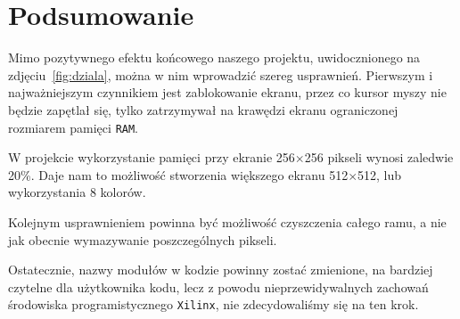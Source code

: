 \section{Podsumowanie}
\label{sec:podsumowanie}

Mimo pozytywnego efektu końcowego naszego projektu, uwidocznionego na
zdjęciu~\ref{fig:dziala}, można w nim wprowadzić szereg usprawnień.  Pierwszym
i najważniejszym czynnikiem jest zablokowanie ekranu, przez co kursor myszy nie
będzie zapętlał się, tylko zatrzymywał na krawędzi ekranu ograniczonej rozmiarem
pamięci \texttt{RAM}.

\vspace{1em}
W projekcie wykorzystanie pamięci przy ekranie 256$\times$256 pikseli wynosi
zaledwie 20\%. Daje nam to możliwość stworzenia większego ekranu 512$\times$512,
lub wykorzystania 8 kolorów.

\vspace{1em}
Kolejnym usprawnieniem powinna być możliwość czyszczenia całego ramu, a nie jak
obecnie wymazywanie poszczególnych pikseli.

\vspace{1em}
Ostatecznie, nazwy modułów w kodzie powinny zostać zmienione, na bardziej
czytelne dla użytkownika kodu, lecz z powodu nieprzewidywalnych zachowań
środowiska programistycznego \texttt{Xilinx}, nie zdecydowaliśmy się na ten
krok.

